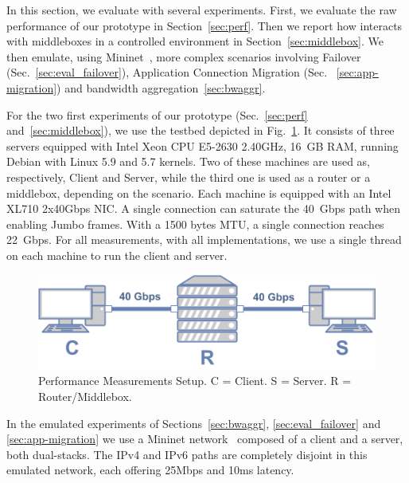 
In this section, we evaluate \tcpls with several experiments.
First, we evaluate the raw performance of our \tcpls prototype in 
Section~\ref{sec:perf}. Then we report how \tcpls
interacts with middleboxes in a controlled environment in 
Section~\ref{sec:middlebox}. We then emulate, using
Mininet~\cite{handigol2012reproducible}, more complex scenarios involving 
Failover (Sec.~\ref{sec:eval_failover}), Application Connection Migration (Sec.
~\ref{sec:app-migration}) and bandwidth aggregation~\ref{sec:bwaggr}.


For the two first experiments of 
our \tcpls prototype (Sec.~\ref{sec:perf} and~\ref{sec:middlebox}), we use the 
testbed depicted
in Fig.~\ref{fig:perf_testbed}. It consists of three servers equipped
with Intel Xeon CPU E5-2630 2.40GHz, 16~GB RAM, running
Debian with Linux 5.9 and 5.7 kernels. Two of these machines are used as,
respectively, Client and Server, while the third one is used as a router or a
middlebox, depending on the scenario. Each machine is equipped with an Intel
XL710 2x40Gbps NIC. A single \tcp connection can saturate the 40~Gbps path when 
enabling Jumbo frames. With a 1500 bytes MTU, a single \tcp connection reaches 
22~Gbps. For all measurements, with all implementations, we use a single thread 
on each machine to run the client and server.

\begin{figure}[!t]
	\begin{center}
		\includegraphics[width=.6\columnwidth]{figures/testbed.png}
	\end{center}
	\vspace{-0.5cm}
	\caption{Performance Measurements Setup. C = Client. S = Server. R = 
	Router/Middlebox.}
	\label{fig:perf_testbed}
\end{figure}

In the emulated experiments of Sections~\ref{sec:bwaggr}, 
\ref{sec:eval_failover} and \ref{sec:app-migration} we use a Mininet 
network~\cite{handigol2012reproducible} composed of a client and a server, both 
dual-stacks. The IPv4 and IPv6 paths are completely disjoint in this emulated 
network, each offering 25Mbps and 10ms latency. 



